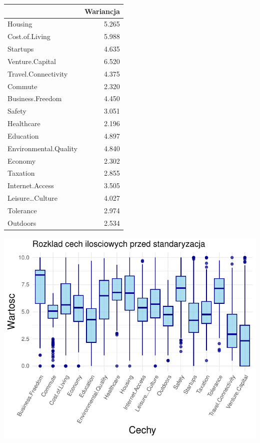 \documentclass[
  12pt,
]{article}
\begin{document}
\begin{longtable}[]{@{}lr@{}}
\toprule\noalign{}
& Wariancja \\
\midrule\noalign{}
\endhead
\bottomrule\noalign{}
\endlastfoot
Housing & 5.265 \\
Cost.of.Living & 5.988 \\
Startups & 4.635 \\
Venture.Capital & 6.520 \\
Travel.Connectivity & 4.375 \\
Commute & 2.320 \\
Business.Freedom & 4.450 \\
Safety & 3.051 \\
Healthcare & 2.196 \\
Education & 4.897 \\
Environmental.Quality & 4.840 \\
Economy & 2.302 \\
Taxation & 2.855 \\
Internet.Access & 3.505 \\
Leisure\ldots Culture & 4.027 \\
Tolerance & 2.974 \\
Outdoors & 2.534 \\
\end{longtable}

\begin{center}\includegraphics{Sprawozdanie2_files/figure-latex/wykresy_rozkładów_standaryzacja_boxplot-1} \end{center}
\end{document}
